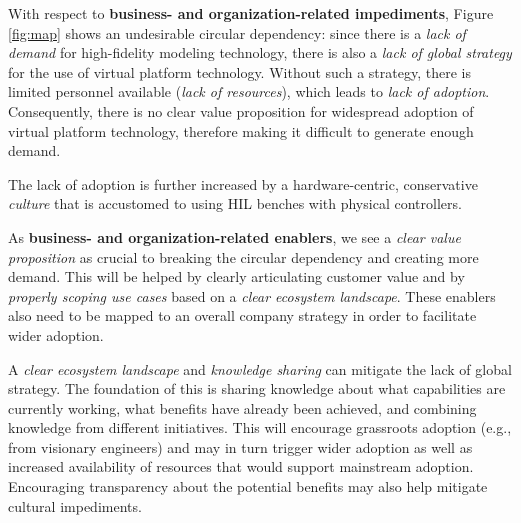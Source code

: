 With respect to \textbf{business- and organization-related impediments}, Figure \ref{fig:map} shows an undesirable circular dependency:
since there is a \emph{lack of demand} for high-fidelity modeling technology,
there is also a \emph{lack of global strategy} for the use of virtual platform technology.
Without such a strategy, there is limited personnel available (\emph{lack of resources}),
which leads to \emph{lack of adoption}.
Consequently, there is no clear value proposition for widespread adoption of virtual platform technology, therefore making it difficult to generate enough demand.

The lack of adoption is further increased by a hardware-centric, conservative \emph{culture} that is accustomed to using HIL benches with physical controllers.

As \textbf{business- and organization-related enablers}, %
we see a \emph{clear value proposition} as crucial to breaking the circular dependency and creating more demand.
This will be helped by clearly articulating customer value and by \emph{properly scoping use cases} based on a \emph{clear ecosystem landscape}.
These enablers also need to be mapped to an overall company strategy in order to facilitate wider adoption. 

A \emph{clear ecosystem landscape} and \emph{knowledge sharing} can mitigate the lack of global strategy.
The foundation of this is sharing knowledge about what capabilities are currently working, what benefits have already been achieved, and combining knowledge from different initiatives.
This will encourage grassroots adoption (e.g., from visionary engineers) and may in turn trigger wider adoption
as well as increased availability of resources that would support mainstream adoption. Encouraging transparency about the potential benefits may also help mitigate cultural impediments.

